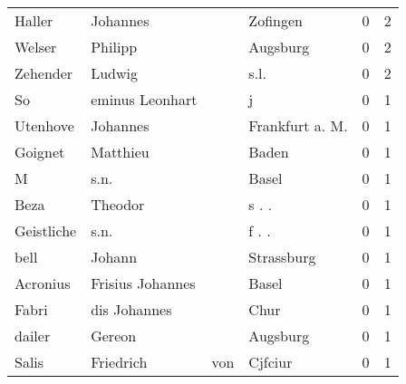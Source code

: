 \begin{tabular}{llllrr}
                   Haller &                           Johannes &             &                                    Zofingen &          0 &         2 \\
                   Welser &                            Philipp &             &                                    Augsburg &          0 &         2 \\
                 Zehender &                             Ludwig &             &                                        s.l. &          0 &         2 \\
                       So &                    eminus Leonhart &             &                                           j &          0 &         1 \\
                 Utenhove &                           Johannes &             &                            Frankfurt a. M.  &          0 &         1 \\
                  Goignet &                           Matthieu &             &                                       Baden &          0 &         1 \\
                        M &                               s.n. &             &                                       Basel &          0 &         1 \\
                     Beza &                            Theodor &             &                                      s . .  &          0 &         1 \\
               Geistliche &                               s.n. &             &                                      f . .  &          0 &         1 \\
                     bell &                             Johann &             &                                  Strassburg &          0 &         1 \\
                 Acronius &                   Frisius Johannes &             &                                       Basel &          0 &         1 \\
                    Fabri &                       dis Johannes &             &                                        Chur &          0 &         1 \\
                   dailer &                             Gereon &             &                                    Augsburg &          0 &         1 \\
                    Salis &                          Friedrich &         von &                                     Cjfciur &          0 &         1 \\

\end{tabular}
